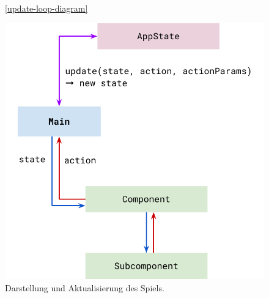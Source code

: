 \begin{figure}
  \caption{Darstellung und Aktualisierung des Spiels.}

  \ref{update-loop-diagram}
  
  \includegraphics{figures/statemanagement-flow.pdf}
\end{figure}

